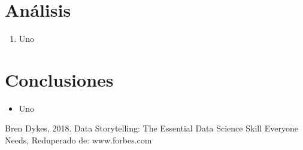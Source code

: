 \documentclass[twoside,twocolumn]{article}
\begin{document}

\section{Análisis}

\begin{enumerate}

    \item Uno
\end{enumerate}


\section{Conclusiones}
\begin{itemize}	
 \item Uno

\end{itemize} 





\begin{thebibliography}{99} 

\bibitem[1]{}
\newblock Bren Dykes, 2018. Data Storytelling: The Essential Data Science Skill Everyone Needs, Reduperado de: www.forbes.com




\end{thebibliography}


\end{document}
